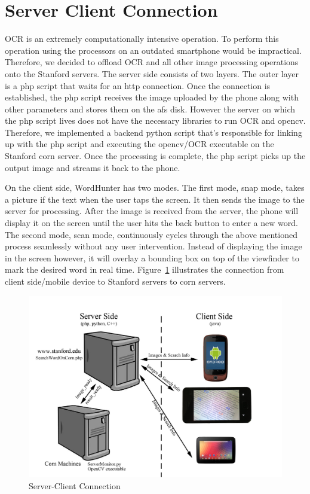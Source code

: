\documentclass[conference]{IEEEtran}
\begin{document}
\section{Server Client Connection}

OCR is an extremely computationally intensive operation. To perform this operation using the processors on an outdated smartphone would be impractical. Therefore, we decided to offload OCR and all other image processing operations onto the Stanford servers. The server side consists of two layers. The outer layer is a php script that waits for an http connection. Once the connection is established, the php script receives the image uploaded by the phone along with other parameters and stores them on the afs disk. However the server on which the php script lives does not have the necessary libraries to run OCR and opencv. Therefore, we implemented a backend python script that’s responsible for linking up with the php script and executing the opencv/OCR executable on the Stanford corn server. Once the processing is complete, the php script picks up the output image and streams it back to the phone. 

On the client side, WordHunter has two modes. The first mode, snap mode, takes a picture if the text when the user taps the screen. It then sends the image to the server for processing. After the image is received from the server, the phone will display it on the screen until the user hits the back button to enter a new word.  The second mode, scan mode, continuously cycles through the above mentioned process seamlessly without any user intervention. Instead of displaying the image in the screen however, it will overlay a bounding box on top of the viewfinder to mark the desired word in real time.  Figure~\ref{server_client} illustrates the connection from client side/mobile device to Stanford servers to corn servers.

\begin{figure}
\center
\includegraphics[scale=0.15]{server_client_connection.jpg}
\caption{Server-Client Connection}
\label{server_client}
\end{figure}
\end{document}
